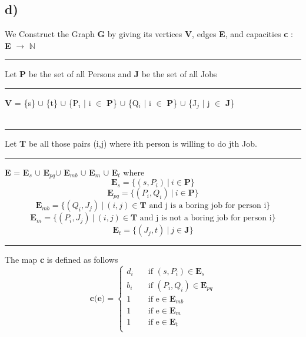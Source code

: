 \documentclass{report}
\begin{document}
 \subsection*{d)}We Construct the Graph \textbf{G} by giving its  vertices \textbf{V}, edges \textbf{E}, and capacities \textbf{c} : \textbf{E} $\rightarrow$ $\mathbb{N}$\\
 \rule[0.5cm]{2cm}{0pt} Let \textbf{P} be the set of all Persons and \textbf{J} be the set of all Jobs\\
 \rule[0.5mm]{2cm}{0pt} \textbf{V} = \{s\} $\cup$ \{t\} $\cup$ \{P$_i$ $|$ i $\in$ \textbf{P}\} $\cup$ \{Q$_i$ $|$ i $\in$ \textbf{P}\} $\cup$ \{J$_j$ $|$ j $\in$ \textbf{J}\} \\
 \vspace*{0em}\\
 \rule[0.5mm]{2cm}{0pt} Let \textbf{T} be all those pairs (i,j) where ith person is willing to do jth Job.\\
 \rule[0.5mm]{2cm}{0pt} \textbf{E} = \textbf{E$_{s}$} $\cup$ \textbf{E$_{pq}$}$\cup$ \textbf{E$_{mb}$} $\cup$ \textbf{E$_{m}$} $\cup$  \textbf{E$_{t}$} where\\
 \begin{equation*}
     \mathbf{E}_s = \{(s,P_i)\  |\  i \in \mathbf{P}\} 
 \end{equation*}
 \begin{equation*}
     \mathbf{E}_{pq} = \{(P_i,Q_i)\  | \ i \in \mathbf{P} \}
 \end{equation*}
 \begin{equation*}
     \mathbf{E}_{mb} = \{(Q_i,J_j)\  | \ (i,j) \in \mathbf{T} \text{ and j is a boring job for person i} \}
 \end{equation*}
 \begin{equation*}
     \mathbf{E}_m = \{(P_i,J_j)\  | \ (i,j) \in \mathbf{T} \text{ and j is not a boring job for person i} \}
 \end{equation*}
 \begin{equation*}
     \mathbf{E}_t = \{(J_j,t)\ |\  j \in \mathbf{J}\}
 \end{equation*}
  \rule[0.5mm]{2cm}{0pt} The map \textbf{c} is defined as follows \\
   \[   
    \textbf{c(e)} = 
         \begin{cases}
           d_i &\quad\text{if }(s,P_i) \in \mathbf{E}_s\\
           b_i &\quad\text{if }(P_i,Q_i) \in \mathbf{E}_{pq}\\
           1 &\quad\text{if e} \in \mathbf{E}_{mb}\\
           1 &\quad\text{if e} \in \mathbf{E}_m\\
           1 &\quad\text{if e} \in \mathbf{E}_t\\
         \end{cases}
    \]
\end{document}
